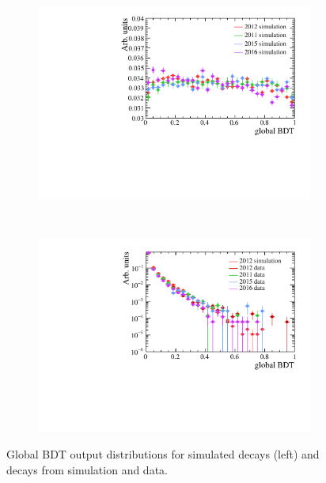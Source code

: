 \begin{figure}[htbp]
    \centering
    \begin{subfigure}[b]{0.48\textwidth}
        \includegraphics[width=\textwidth]{./Figs/Selection/BDTflat_signal.pdf}
    \end{subfigure}
    ~ %
    \begin{subfigure}[b]{0.48\textwidth}
       \includegraphics[width=\textwidth]{./Figs/Selection/BDTflat_bkgnd.pdf}
    \end{subfigure}
    \caption{Global BDT output distributions for \bsmumu simulated decays (left) and \bbbarmumux decays from simulation and data.}
    \label{fig:FlatteningBDT}
\end{figure}


